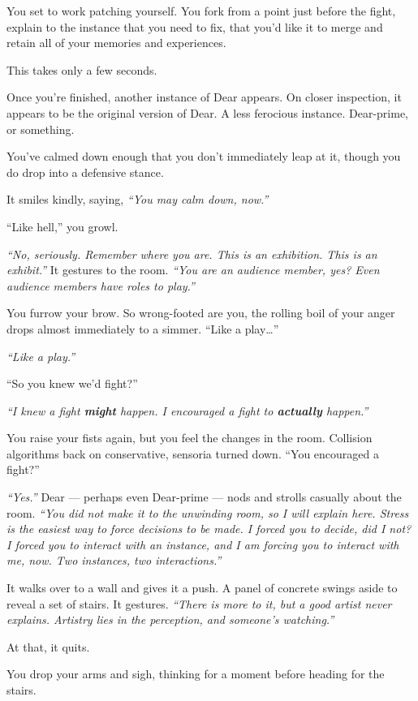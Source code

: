 You set to work patching yourself. You fork from a point just before the fight, explain to the instance that you need to fix, that you'd like it to merge and retain all of your memories and experiences.

This takes only a few seconds.

Once you're finished, another instance of Dear appears. On closer inspection, it appears to be the original version of Dear. A less ferocious instance. Dear-prime, or something.

You've calmed down enough that you don't immediately leap at it, though you do drop into a defensive stance.

It smiles kindly, saying, \emph{``You may calm down, now.''}

``Like hell,'' you growl.

\emph{``No, seriously. Remember where you are. This is an exhibition. This is an exhibit.''} It gestures to the room. \emph{``You are an audience member, yes? Even audience members have roles to play.''}

You furrow your brow. So wrong-footed are you, the rolling boil of your anger drops almost immediately to a simmer. ``Like a play\ldots{}''

\emph{``Like a play.''}

``So you knew we'd fight?''

\emph{``I knew a fight \textbf{might} happen. I encouraged a fight to \textbf{actually} happen.''}

You raise your fists again, but you feel the changes in the room. Collision algorithms back on conservative, sensoria turned down. ``You encouraged a fight?''

\emph{``Yes.''} Dear --- perhaps even Dear-prime --- nods and strolls casually about the room. \emph{``You did not make it to the unwinding room, so I will explain here. Stress is the easiest way to force decisions to be made. I forced you to decide, did I not? I forced you to interact with an instance, and I am forcing you to interact with me, now. Two instances, two interactions.''}

It walks over to a wall and gives it a push. A panel of concrete swings aside to reveal a set of stairs.  It gestures. \emph{``There is more to it, but a good artist never explains. Artistry lies in the perception, and someone's watching.''}

At that, it quits.

You drop your arms and sigh, thinking for a moment before heading for the stairs.

